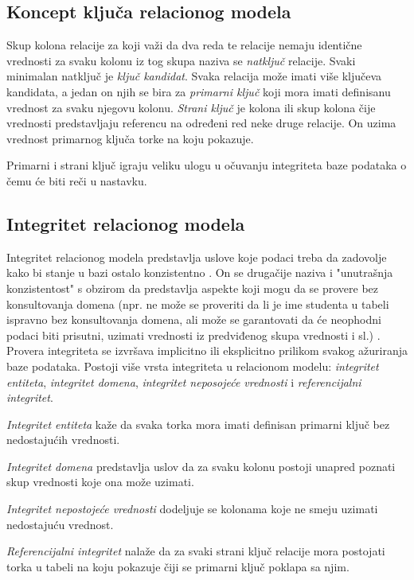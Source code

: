 \documentclass[12pt,oneside]{memoir}
\begin{document}
\subsection{Koncept ključa relacionog modela}

Skup kolona relacije za koji važi da dva reda te relacije nemaju identične vrednosti za svaku kolonu iz tog skupa naziva  se \textit{natključ} relacije. Svaki minimalan natključ je \textit{ključ kandidat}. Svaka relacija može imati više ključeva kandidata, a jedan on njih se bira za  \textit{primarni ključ} koji mora imati definisanu vrednost za svaku njegovu kolonu.
\textit{Strani ključ} je kolona ili skup kolona čije vrednosti predstavljaju referencu na određeni red neke druge relacije. On uzima vrednost primarnog ključa torke na koju pokazuje. 

Primarni i strani ključ igraju veliku ulogu u očuvanju integriteta baze podataka o čemu će biti reči u nastavku.

\subsection{Integritet relacionog modela}

Integritet relacionog modela predstavlja uslove koje podaci treba da zadovolje kako bi stanje u bazi ostalo konzistentno \cite{URBP} . On se drugačije naziva i "unutrašnja konzistentost" s obzirom da predstavlja aspekte koji mogu da se provere bez konsultovanja domena (npr. ne može se proveriti da li je ime studenta u tabeli ispravno bez konsultovanja domena, ali može se garantovati da će neophodni podaci biti prisutni, uzimati vrednosti iz predviđenog skupa vrednosti i sl.) . Provera integriteta se izvršava implicitno ili eksplicitno prilikom svakog ažuriranja baze podataka. Postoji više vrsta integriteta u relacionom modelu:  \textit{integritet entiteta}, \textit{integritet domena}, \textit{integritet neposojeće vrednosti} i \textit{referencijalni integritet}.

 \textit{Integritet entiteta} kaže da svaka torka mora imati definisan primarni ključ bez nedostajućih vrednosti.

\textit{Integritet domena} predstavlja uslov da za svaku kolonu postoji unapred poznati skup vrednosti koje ona može uzimati.

\textit{Integritet nepostojeće vrednosti} dodeljuje se kolonama koje  ne smeju uzimati nedostajuću vrednost.

\textit{Referencijalni integritet} nalaže da za svaki strani ključ relacije mora postojati torka u tabeli na koju pokazuje čiji se primarni ključ poklapa sa njim.
\end{document}
